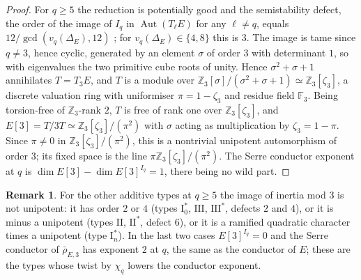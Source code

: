 \documentclass[11pt]{amsart}
\theoremstyle{definition}
\newtheorem{remark}[theorem]{Remark}
\newcommand{\Z}{\mathbb{Z}}
\newcommand{\F}{\mathbb{F}}
\begin{document}
\begin{proof}
For $q\ge5$ the reduction is potentially good and the semistability defect, the order of the image of $I_q$ in $\operatorname{Aut}(T_\ell E)$ for any $\ell\ne q$, equals $12/\gcd(v_q(\Delta_E),12)$ \cite{Kraus90}; for $v_q(\Delta_E)\in\{4,8\}$ this is $3$. The image is tame since $q\ne3$, hence cyclic, generated by an element $\sigma$ of order $3$ with determinant $1$, so with eigenvalues the two primitive cube roots of unity. Hence $\sigma^2+\sigma+1$ annihilates $T=T_3E$, and $T$ is a module over $\Z_3[\sigma]/(\sigma^2+\sigma+1)\simeq\Z_3[\zeta_3]$, a discrete valuation ring with uniformiser $\pi=1-\zeta_3$ and residue field $\F_3$. Being torsion-free of $\Z_3$-rank $2$, $T$ is free of rank one over $\Z_3[\zeta_3]$, and $E[3]=T/3T\simeq\Z_3[\zeta_3]/(\pi^2)$ with $\sigma$ acting as multiplication by $\zeta_3=1-\pi$. Since $\pi\ne0$ in $\Z_3[\zeta_3]/(\pi^2)$, this is a nontrivial unipotent automorphism of order $3$; its fixed space is the line $\pi\Z_3[\zeta_3]/(\pi^2)$. The Serre conductor exponent at $q$ is $\dim E[3]-\dim E[3]^{I_q}=1$, there being no wild part.
\end{proof}

\begin{remark}\label{rem:types}
For the other additive types at $q\ge5$ the image of inertia mod $3$ is not unipotent: it has order $2$ or $4$ (types $\mathrm{I}_0^*$, $\mathrm{III}$, $\mathrm{III}^*$, defects $2$ and $4$), or it is minus a unipotent (types $\mathrm{II}$, $\mathrm{II}^*$, defect $6$), or it is a ramified quadratic character times a unipotent (type $\mathrm{I}_n^*$). In the last two cases $E[3]^{I_q}=0$ and the Serre conductor of $\bar\rho_{E,3}$ has exponent $2$ at $q$, the same as the conductor of $E$; these are the types whose twist by $\chi_q$ lowers the conductor exponent.
\end{remark}
\end{document}
